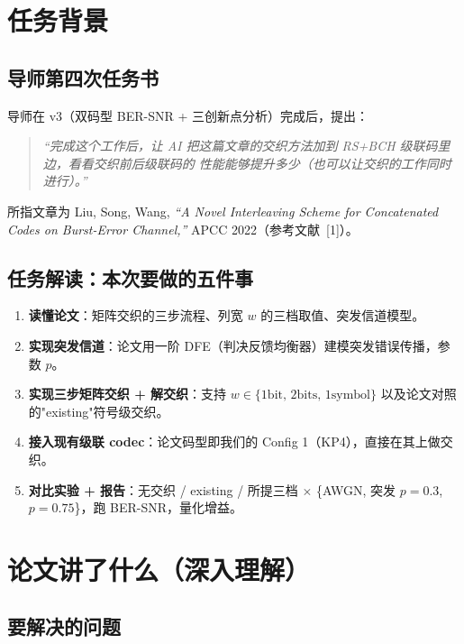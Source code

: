 \documentclass[11pt,a4paper]{article}
\begin{document}
\section{任务背景}

\subsection{导师第四次任务书}

导师在 v3（双码型 BER-SNR + 三创新点分析）完成后，提出：

\begin{quote}\itshape
``完成这个工作后，让 AI 把这篇文章的交织方法加到 RS+BCH 级联码里边，看看交织前后级联码的
性能能够提升多少（也可以让交织的工作同时进行）。''
\end{quote}

所指文章为 Liu, Song, Wang, \emph{``A Novel Interleaving Scheme for Concatenated Codes on
Burst-Error Channel,''} APCC 2022（参考文献~[1]）。

\subsection{任务解读：本次要做的五件事}

\begin{enumerate}[leftmargin=1.6em, itemsep=2pt]
\item \textbf{读懂论文}：矩阵交织的三步流程、列宽 $w$ 的三档取值、突发信道模型。
\item \textbf{实现突发信道}：论文用一阶 DFE（判决反馈均衡器）建模突发错误传播，参数 $p$。
\item \textbf{实现三步矩阵交织 + 解交织}：支持 $w\in\{1\text{bit},\,2\text{bits},\,1\text{symbol}\}$
      以及论文对照的"existing"符号级交织。
\item \textbf{接入现有级联 codec}：论文码型即我们的 Config 1（KP4），直接在其上做交织。
\item \textbf{对比实验 + 报告}：无交织 / existing / 所提三档 $\times$ \{AWGN, 突发 $p{=}0.3$,
      $p{=}0.75$\}，跑 BER-SNR，量化增益。
\end{enumerate}

\section{论文讲了什么（深入理解）}

\subsection{要解决的问题}
\end{document}
